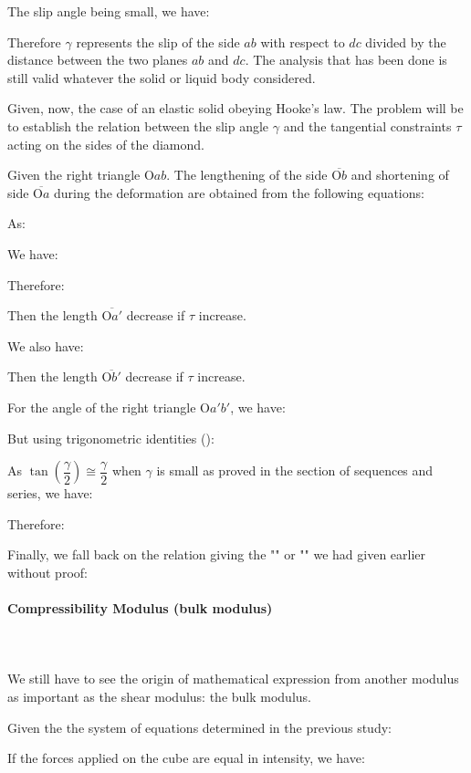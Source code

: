 	The slip angle being small, we have:
	
	Therefore $\gamma$ represents the slip of the side $ab$ with respect to $dc$ divided by the distance between the two planes $ab$ and $dc$. The analysis that has been done is still valid whatever the solid or liquid body considered.

	Given, now, the case of an elastic solid obeying Hooke's law. The problem will be to establish the relation between the slip angle $\gamma$ and the tangential  constraints $\tau$ acting on the sides of the diamond.

	Given the right triangle $\text{O}ab$. The lengthening of the side $\overline{\text{O}b}$ and shortening of side $\overline{\text{O}a}$ during the deformation are obtained from the following equations:
	
	As:
	
	We have:
	
	Therefore:
	
	Then the length $\overline{\text{O}a'}$ decrease if $\tau$ increase.

	We also have:
	
	Then the length $\overline{\text{O}b'}$ decrease if $\tau$ increase.

	For the angle of the right triangle $\text{O}a'b'$, we have:
	
	But using trigonometric identities ():
	
	As $\tan\left(\dfrac{\gamma}{2}\right)\cong \dfrac{\gamma}{2}$ when $\gamma$ is small as proved in the section of sequences and series, we have:
	
	Therefore:
	
	Finally, we fall back on the relation giving the "" or "" we had given earlier without proof:
	
	
	\paragraph{Compressibility Modulus (bulk modulus)}\mbox{}\\\\
	We still have to see the origin of mathematical expression from another modulus as important as the shear modulus: the bulk modulus.
	
	Given the the system of equations determined in the previous study:
	
	If the forces applied on the cube are equal in intensity, we have:
	
